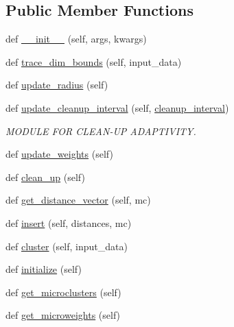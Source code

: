 \subsection*{Public Member Functions}
\begin{DoxyCompactItemize}
\item 
def \hyperlink{classEvoStreamV2_1_1EvoStreamV2_abb132ec68b69e9c110cfa8dda41c5883}{\+\_\+\+\_\+init\+\_\+\+\_\+} (self, args, kwargs)
\item 
def \hyperlink{classEvoStreamV2_1_1EvoStreamV2_a68d6fba0a304fba692ef9bf05895485f}{trace\+\_\+dim\+\_\+bounds} (self, input\+\_\+data)
\item 
def \hyperlink{classEvoStreamV2_1_1EvoStreamV2_a9afdfedd15061d018f5bc70b4d83c275}{update\+\_\+radius} (self)
\item 
def \hyperlink{classEvoStreamV2_1_1EvoStreamV2_afd32bf2dea820d91e86a07e613724c70}{update\+\_\+cleanup\+\_\+interval} (self, \hyperlink{classEvoStreamV2_1_1EvoStreamV2_a8a5bb2fe93ea6fd5d074f16ab41da87b}{cleanup\+\_\+interval})
\begin{DoxyCompactList}\small\item\em M\+O\+D\+U\+LE F\+OR C\+L\+E\+A\+N-\/\+UP A\+D\+A\+P\+T\+I\+V\+I\+TY. \end{DoxyCompactList}\item 
def \hyperlink{classEvoStreamV2_1_1EvoStreamV2_a9937ba5603d9473a47cd277018469313}{update\+\_\+weights} (self)
\item 
def \hyperlink{classEvoStreamV2_1_1EvoStreamV2_add319a40604efb860ff2ca9a69bfd58a}{clean\+\_\+up} (self)
\item 
def \hyperlink{classEvoStreamV2_1_1EvoStreamV2_acdd702fae75a710c649991dfe37fb45d}{get\+\_\+distance\+\_\+vector} (self, mc)
\item 
def \hyperlink{classEvoStreamV2_1_1EvoStreamV2_a82b6002022ad5502a578e5919407de99}{insert} (self, distances, mc)
\item 
def \hyperlink{classEvoStreamV2_1_1EvoStreamV2_a1d8ce59185f7f30d7c08b62aafc043f8}{cluster} (self, input\+\_\+data)
\item 
def \hyperlink{classEvoStreamV2_1_1EvoStreamV2_ab9e15f5f466ab1ed0459f0ae2ffc5fbd}{initialize} (self)
\item 
def \hyperlink{classEvoStreamV2_1_1EvoStreamV2_ab6416e52d27660e9bc69253ce209c16a}{get\+\_\+microclusters} (self)
\item 
def \hyperlink{classEvoStreamV2_1_1EvoStreamV2_a2b9409dce91ef49f61341e6ebf17fa98}{get\+\_\+microweights} (self)
\item 

\end{DoxyCompactItemize}
